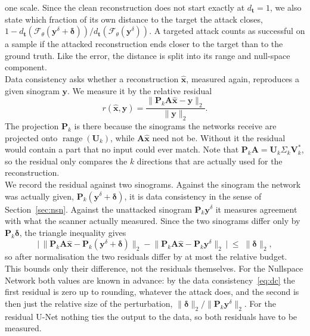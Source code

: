 \documentclass{article}
\numberwithin{equation}{section}
\begin{document}
one scale. Since the clean reconstruction does not start exactly at $d_\mathbf{t}=1$, we also state
which fraction of its own distance to the target the attack closes,
$1-d_\mathbf{t}(\mathcal{F}_\theta(\mathbf{y}^\delta+\boldsymbol{\delta}))/d_\mathbf{t}(\mathcal{F}_\theta(\mathbf{y}^\delta))$.
A targeted attack counts as successful on a sample if the attacked reconstruction ends
closer to the target than to the ground truth. Like the error, the distance is split into its range
and null-space component.\\
Data consistency asks whether a reconstruction $\hat{\mathbf{x}}$, measured again, reproduces
a given sinogram $\mathbf{y}$. We measure it by the relative residual
\[r(\hat{\mathbf{x}},\mathbf{y})=\frac{\lVert\mathbf{P}_k
\mathbf{A}\hat{\mathbf{x}}-\mathbf{y}\rVert_2}
{\lVert\mathbf{y}\rVert_2}.\]
The projection $\mathbf{P}_k$ is there because the sinograms the networks receive are
projected onto $\operatorname{range}(\mathbf{U}_k)$, while $\mathbf{A}\hat{\mathbf{x}}$ need not be.
Without it the residual would contain a part that no input could ever match. Note that
$\mathbf{P}_k\mathbf{A}=\mathbf{U}_k\Sigma_k\mathbf{V}_k^{*}$, so the residual only compares
the $k$ directions that are actually used for the reconstruction.\\
We record the residual against two sinograms. Against the sinogram the network was actually given,
$\mathbf{P}_k(\mathbf{y}^\delta+\boldsymbol{\delta})$, it is data consistency in the sense of
Section~\ref{sec:nsn}. Against the unattacked sinogram $\mathbf{P}_k\mathbf{y}^\delta$ it measures
agreement with what the scanner actually measured. Since the two sinograms differ only by
$\mathbf{P}_k\boldsymbol{\delta}$, the triangle inequality gives
\[\big|\,\lVert\mathbf{P}_k\mathbf{A}\hat{\mathbf{x}}-\mathbf{P}_k(\mathbf{y}^\delta+\boldsymbol{\delta})\rVert_2
-\lVert\mathbf{P}_k\mathbf{A}\hat{\mathbf{x}}-\mathbf{P}_k\mathbf{y}^\delta\rVert_2\,\big|
\;\leq\;\lVert\boldsymbol{\delta}\rVert_2 ,\]
so after normalisation the two residuals differ by at most the relative budget. This bounds only their
difference, not the residuals themselves. For the Nullspace Network both values are known in advance: by
the data consistency~\eqref{eq:dc} the first residual is zero up to rounding, whatever the attack does, and
the second is then just the relative size of the perturbation,
$\lVert\boldsymbol{\delta}\rVert_2/\lVert\mathbf{P}_k\mathbf{y}^\delta\rVert_2$. For the residual U-Net
nothing ties the output to the data, so both residuals have to be measured.\\
\end{document}
